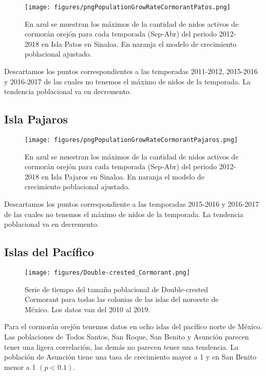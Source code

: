 \documentclass{article} %
\begin{document}
\begin{figure}[H]
\hspace{-2cm}
    \texttt{[image: figures/pngPopulationGrowRateCormorantPatos.png]}
\caption{En azul se muestran los máximos de la cantidad de nidos activos de cormorán orejón para cada temporada (Sep-Abr) del periodo 2012-2018 en Isla Patos en Sinaloa. En naranja el modelo de crecimiento poblacional ajustado.}
\end{figure}

Descartamos los puntos correspondientes a las temporadas 2011-2012, 2015-2016 y 2016-2017 de las cuales no tenemos el máximo de nidos de la temporada. La tendencia poblacional va en decremento.


\subsection*{Isla Pajaros}

\begin{figure}[H]
\hspace{-2cm}
    \texttt{[image: figures/pngPopulationGrowRateCormorantPajaros.png]}
\caption{En azul se muestran los máximos de la cantidad de nidos activos de cormorán orejón para cada temporada (Sep-Abr) del periodo 2012-2018 en Isla Pajaros en Sinaloa. En naranja el modelo de crecimiento poblacional ajustado.}
\end{figure}

Descartamos los puntos correspondiente a las temporadas 2015-2016 y 2016-2017 de las cuales no tenemos el máximo de nidos de la temporada. La tendencia poblacional va en decremento.


\subsection*{Islas del Pacífico}

\begin{figure}[H]
\hspace{-2cm}
    \texttt{[image: figures/Double-crested\_Cormorant.png]}
\caption{Serie de tiempo del tamaño poblacional de Double-crested Cormorant para todas las colonias de las islas del noroeste de México. Los datos van del 2010 al 2019.}
\end{figure}

Para el cormorán orejón tenemos datos en ocho islas del pacífico norte de México. Las poblaciones de Todos Santos, San Roque, San Benito y Asunción parecen tener una ligera correlación, las demás no parecen tener una tendencia. La población de Asunción tiene una tasa de crecimiento mayor a 1 y en San Benito menor a 1 $(p < 0.1)$.

 

\end{document}
